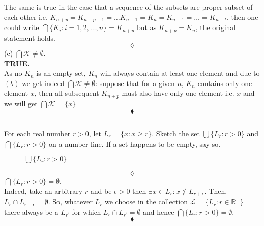 The same is true in the case that a sequence of the subsets are proper subset of each other i.e. $K_{n+p}=K_{n+p-1}=\dots K_{n+1}=K_{n} = K_{n-1}=\dots =  K_{n-t}$. then one could write $\bigcap \{K_i:i=1,2,\dots,n\}= K_{n+p}$ but as $K_{n+p}=K_n$, the original statement holds.
$$\lozenge$$
(c) $\bigcap \mathscr{K}\ne \emptyset$.\\
\textbf{TRUE.\\}
As no $K_n$ is an empty set, $K_n$ will always contain at least one element and due to $(b)$ we get indeed $\bigcap \mathscr{K}\ne \emptyset$: suppose that for a given $n$, $K_n$ contains only one element $x$, then all subsequent $K_{n+p}$ must also have only one element i.e. $x$ and we will get $\bigcap \mathscr{K}=\{x\}$ 
$$\blacklozenge$$

\subsection{}
\begin{tcolorbox}
For each real number $r>0$, let $L_r=\{x:x\ge r\}$. Sketch the set $\bigcup \{L_r:r>0\}$ and $\bigcap\{L_r:r>0\}$ on a number line. If a set happens to be empty, say so.
\end{tcolorbox}
\begin{figure}[H]%
    \centering
    
\caption{$\bigcup \{L_r:r>0\}$}
\label{fig:fig_p8b}
\end{figure}
$$\lozenge$$
$\bigcap\{L_r:r>0\}=\emptyset$.\\

Indeed, take an arbitrary $r$ and  be $\epsilon > 0$ then $\exists x\in L_r: x\not \in L_{r+\epsilon}$. Then, $L_r\cap L_{r+\epsilon} =\emptyset$. So, whatever $L_r$ we choose in the collection $\mathscr{L}=\{L_r: r\in\mathbb{R}^+\}$ there always be a $L_{r^{'}}$ for which $L_r\cap L_{r^{'}}=\emptyset$ and hence $\bigcap\{L_r:r>0\}=\emptyset$.
$$\blacklozenge$$
\newpage

